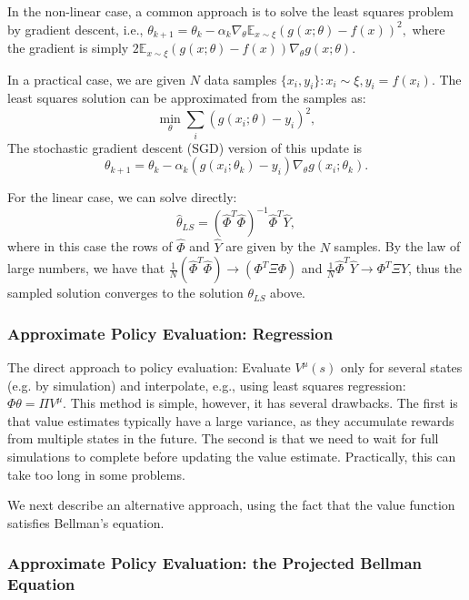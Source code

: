 In the non-linear case, a common approach is to solve the least squares problem by gradient descent, i.e., $\theta_{k+1} = \theta_k - \alpha_k \nabla_\theta \mathbb{E}_{x\sim\xi} (g(x;\theta) - f(x))^2,$ where the gradient is simply $2 \mathbb{E}_{x\sim\xi} (g(x;\theta) - f(x))\nabla_\theta g(x;\theta)$. 

In a practical case, we are given $N$ data samples $\{ x_i, y_i \}: x_i\sim \xi, y_i=f(x_i)$. The least squares solution can be approximated from the samples as:
$$
\min_\theta \sum_i (g(x_i;\theta) - y_i)^2,
$$
The stochastic gradient descent (SGD) version of this update is
$$
\theta_{k+1} = \theta_k - \alpha_k (g(x_i;\theta_k) - y_i)\nabla_\theta g(x_i;\theta_k).
$$

For the linear case, we can solve directly:
$$
\hat{\theta}_{LS} = (\hat{\Phi}^T \hat{\Phi})^{-1} \hat{\Phi}^T \hat{Y},
$$
where in this case the rows of $\hat{\Phi}$ and $\hat{Y}$ are given by the $N$ samples. By the law of large numbers, we have that $\frac{1}{N}(\hat{\Phi}^T \hat{\Phi}) \to (\Phi^T \Xi \Phi)$ and $\frac{1}{N}\hat{\Phi}^T \hat{Y} \to \Phi^T \Xi Y$, thus the sampled solution converges to the solution $\theta_{LS}$ above.

\subsubsection{Approximate Policy Evaluation: Regression}

The direct approach to policy evaluation: Evaluate $V^\mu(s)$ only for several states (e.g. by simulation) and interpolate, e.g., using least squares regression: $\Phi \theta = \Pi V^\mu$. This method is simple, however, it has several drawbacks. The first is that value estimates typically have a large variance, as they accumulate rewards from multiple states in the future. The second is that we need to wait for full simulations to complete before updating the value estimate. Practically, this can take too long in some problems. 

We next describe an alternative approach, using the fact that the value function satisfies Bellman's equation.

\subsubsection{Approximate Policy Evaluation: the Projected Bellman Equation}

